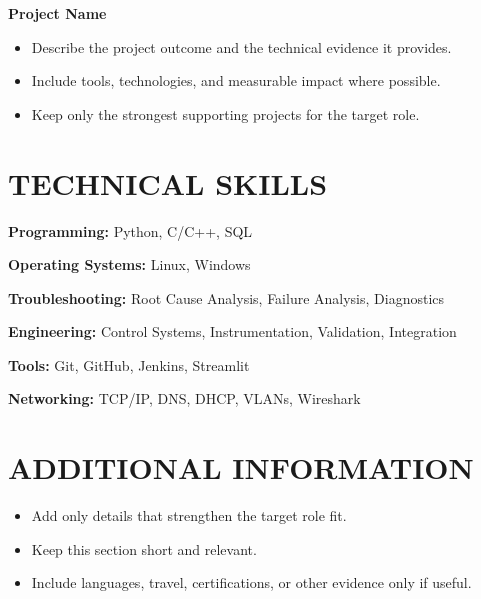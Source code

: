 \documentclass[a4paper,10pt]{article}
\begin{document}
\textbf{Project Name}

\begin{itemize}[leftmargin=*]
\item Describe the project outcome and the technical evidence it provides.
\item Include tools, technologies, and measurable impact where possible.
\item Keep only the strongest supporting projects for the target role.
\end{itemize}

\section{TECHNICAL SKILLS}

\textbf{Programming:} Python, C/C++, SQL

\textbf{Operating Systems:} Linux, Windows

\textbf{Troubleshooting:} Root Cause Analysis, Failure Analysis, Diagnostics

\textbf{Engineering:} Control Systems, Instrumentation, Validation, Integration

\textbf{Tools:} Git, GitHub, Jenkins, Streamlit

\textbf{Networking:} TCP/IP, DNS, DHCP, VLANs, Wireshark

\section{ADDITIONAL INFORMATION}

\begin{itemize}[leftmargin=*]
\item Add only details that strengthen the target role fit.
\item Keep this section short and relevant.
\item Include languages, travel, certifications, or other evidence only if useful.
\end{itemize}
\end{document}
